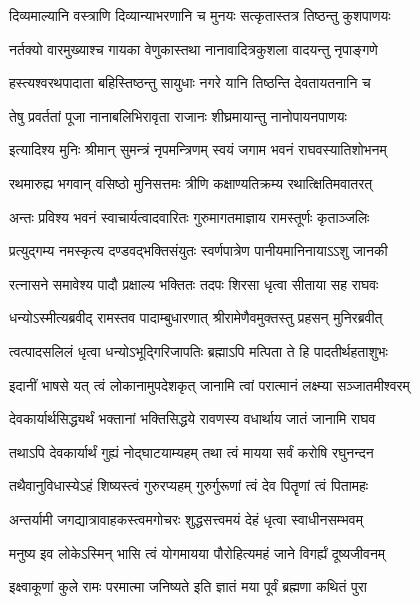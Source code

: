 \twolineshloka
{दिव्यमाल्यानि वस्त्राणि दिव्यान्याभरणानि च}
{मुनयः सत्कृतास्तत्र तिष्ठन्तु कुशपाणयः} %

\twolineshloka
{नर्तक्यो वारमुख्याश्च गायका वेणुकास्तथा}
{नानावादित्रकुशला वादयन्तु नृपाङ्गणे} %

\twolineshloka
{हस्त्यश्वरथपादाता बहिस्तिष्ठन्तु सायुधाः}
{नगरे यानि तिष्ठन्ति देवतायतनानि च} %

\twolineshloka
{तेषु प्रवर्ततां पूजा नानाबलिभिरावृता}
{राजानः शीघ्रमायान्तु नानोपायनपाणयः} %

\twolineshloka
{इत्यादिश्य मुनिः श्रीमान् सुमन्त्रं नृपमन्त्रिणम्}
{स्वयं जगाम भवनं राघवस्यातिशोभनम्} %

\twolineshloka
{रथमारुह्य भगवान् वसिष्ठो मुनिसत्तमः}
{त्रीणि कक्षाण्यतिक्रम्य रथात्क्षितिमवातरत्} %

\twolineshloka
{अन्तः प्रविश्य भवनं स्वाचार्यत्वादवारितः}
{गुरुमागतमाज्ञाय रामस्तूर्णः कृताञ्जलिः} %

\twolineshloka
{प्रत्युद्गम्य नमस्कृत्य दण्डवद्भक्तिसंयुतः}
{स्वर्णपात्रेण पानीयमानिनायाऽऽशु जानकी} %

\twolineshloka
{रत्नासने समावेश्य पादौ प्रक्षाल्य भक्तितः}
{तदपः शिरसा धृत्वा सीताया सह राघवः} %

\twolineshloka
{धन्योऽस्मीत्यब्रवीद् रामस्तव पादाम्बुधारणात्}
{श्रीरामेणैवमुक्तस्तु प्रहसन् मुनिरब्रवीत्} %

\twolineshloka
{त्वत्पादसलिलं धृत्वा धन्योऽभूद्गिरिजापतिः}
{ब्रह्माऽपि मत्पिता ते हि पादतीर्थहताशुभः} %

\twolineshloka
{इदानीं भाषसे यत् त्वं लोकानामुपदेशकृत्}
{जानामि त्वां परात्मानं लक्ष्म्या सञ्जातमीश्वरम्} %

\twolineshloka
{देवकार्यार्थसिद्ध्यर्थं भक्तानां भक्तिसिद्धये}
{रावणस्य वधार्थाय जातं जानामि राघव} %

\twolineshloka
{तथाऽपि देवकार्यार्थं गुह्यं नोद्घाटयाम्यहम्}
{तथा त्वं मायया सर्वं करोषि रघुनन्दन} %

\twolineshloka
{तथैवानुविधास्येऽहं शिष्यस्त्वं गुरुरप्यहम्}
{गुरुर्गुरूणां त्वं देव पितॄणां त्वं पितामहः} %

\twolineshloka
{अन्तर्यामी जगद्यात्रावाहकस्त्वमगोचरः}
{शुद्धसत्त्वमयं देहं धृत्वा स्वाधीनसम्भवम्} %

\twolineshloka
{मनुष्य इव लोकेऽस्मिन् भासि त्वं योगमायया}
{पौरोहित्यमहं जाने विगर्ह्यं दूष्यजीवनम्} %

\twolineshloka
{इक्ष्वाकूणां कुले रामः परमात्मा जनिष्यते}
{इति ज्ञातं मया पूर्वं ब्रह्मणा कथितं पुरा} %

